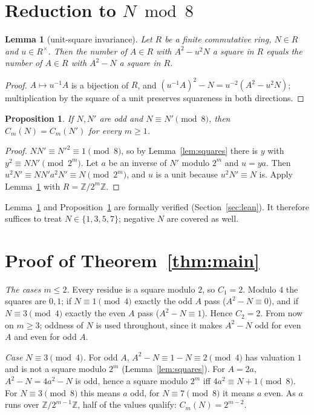 \documentclass[11pt]{amsart}
\newtheorem{proposition}[theorem]{Proposition}
\newtheorem{lemma}[theorem]{Lemma}
\theoremstyle{remark}
\newcommand{\Z}{\mathbb{Z}}
\begin{document}
\section{\texorpdfstring{Reduction to $N\bmod 8$}{Reduction to N mod 8}}

\begin{lemma}[unit-square invariance]\label{lem:scaling}
Let $R$ be a finite commutative ring, $N\in R$ and $u\in R^\times$. Then the number of $A\in R$ with $A^2-u^2N$ a square in $R$ equals the number of $A\in R$ with $A^2-N$ a square in $R$.
\end{lemma}

\begin{proof}
$A\mapsto u^{-1}A$ is a bijection of $R$, and $(u^{-1}A)^2-N=u^{-2}(A^2-u^2N)$; multiplication by the square of a unit preserves squareness in both directions.
\end{proof}

\begin{proposition}\label{prop:mod8}
If $N,N'$ are odd and $N\equiv N'\pmod 8$, then $C_m(N)=C_m(N')$ for every $m\ge1$.
\end{proposition}

\begin{proof}
$NN'\equiv N'^2\equiv1\pmod8$, so by Lemma~\ref{lem:squares} there is $y$ with $y^2\equiv NN'\pmod{2^m}$. Let $a$ be an inverse of $N'$ modulo $2^m$ and $u=ya$. Then $u^2N'\equiv NN'a^2N'\equiv N\pmod{2^m}$, and $u$ is a unit because $u^2N'\equiv N$ is. Apply Lemma~\ref{lem:scaling} with $R=\Z/2^m\Z$.
\end{proof}

Lemma~\ref{lem:scaling} and Proposition~\ref{prop:mod8} are formally verified (Section~\ref{sec:lean}). It therefore suffices to treat $N\in\{1,3,5,7\}$; negative $N$ are covered as well.

\section{\texorpdfstring{Proof of Theorem~\ref{thm:main}}{Proof of Theorem 1}}

\emph{The cases $m\le2$.} Every residue is a square modulo $2$, so $C_1=2$. Modulo $4$ the squares are $0,1$; if $N\equiv1\pmod4$ exactly the odd $A$ pass ($A^2-N\equiv0$), and if $N\equiv3\pmod4$ exactly the even $A$ pass ($A^2-N\equiv1$). Hence $C_2=2$. From now on $m\ge3$; oddness of $N$ is used throughout, since it makes $A^2-N$ odd for even $A$ and even for odd $A$.

\emph{Case $N\equiv3\pmod4$.} For odd $A$, $A^2-N\equiv 1-N\equiv2\pmod4$ has valuation $1$ and is not a square modulo $2^m$ (Lemma~\ref{lem:squares}). For $A=2a$, $A^2-N=4a^2-N$ is odd, hence a square modulo $2^m$ iff $4a^2\equiv N+1\pmod 8$. For $N\equiv3\pmod 8$ this means $a$ odd, for $N\equiv7\pmod8$ it means $a$ even. As $a$ runs over $\Z/2^{m-1}\Z$, half of the values qualify: $C_m(N)=2^{m-2}$.
\end{document}
